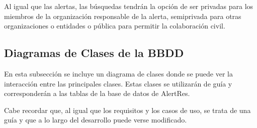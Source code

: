     Al igual que las alertas, las búsquedas tendrán la opción de ser privadas para los miembros de la organización responsable de la alerta, semiprivada para otras organizaciones o entidades o pública para permitir la colaboración civil.


    
\vspace{3cm}
    
    




        \subsection{Diagramas de Clases de la BBDD}
        

        En esta subsección se incluye un diagrama de clases donde se puede ver la interacción entre las principales clases. Estas clases se utilizarán de guía y corresponderán a las tablas de la base de datos de AlertRes. \cite{diagrama_clases}


        Cabe recordar que, al igual que los requisitos y los casos de uso, se trata de una guía y que a lo largo del desarrollo puede verse modificado.



        

            